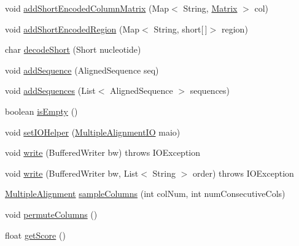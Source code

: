 \begin{DoxyCompactItemize}
\item 
void \hyperlink{classbroad_1_1core_1_1multiplealignment_1_1_multiple_alignment_ad8fe854ec8525256c7b848d48c832f64}{add\+Short\+Encoded\+Column\+Matrix} (Map$<$ String, \hyperlink{class_jama_1_1_matrix}{Matrix} $>$ col)
\item 
void \hyperlink{classbroad_1_1core_1_1multiplealignment_1_1_multiple_alignment_a034bfc282f2aaff7aa3133867dcc2963}{add\+Short\+Encoded\+Region} (Map$<$ String, short\mbox{[}$\,$\mbox{]}$>$ region)
\item 
char \hyperlink{classbroad_1_1core_1_1multiplealignment_1_1_multiple_alignment_a882c67188ee369d1897fe0a9c2cd6822}{decode\+Short} (Short nucleotide)
\item 
void \hyperlink{classbroad_1_1core_1_1multiplealignment_1_1_multiple_alignment_aca0cb83e35314cfff63b9e24508dea0d}{add\+Sequence} (Aligned\+Sequence seq)
\item 
void \hyperlink{classbroad_1_1core_1_1multiplealignment_1_1_multiple_alignment_a37e378ac0476e9ae7f70d891d7e8e644}{add\+Sequences} (List$<$ Aligned\+Sequence $>$ sequences)
\item 
boolean \hyperlink{classbroad_1_1core_1_1multiplealignment_1_1_multiple_alignment_a4c4058ed47c1cf0ccf504de279f16f41}{is\+Empty} ()
\item 
void \hyperlink{classbroad_1_1core_1_1multiplealignment_1_1_multiple_alignment_add81a0e357b98982640e70d83b3652fe}{set\+I\+O\+Helper} (\hyperlink{interfacebroad_1_1core_1_1multiplealignment_1_1_multiple_alignment_i_o}{Multiple\+Alignment\+I\+O} maio)
\item 
void \hyperlink{classbroad_1_1core_1_1multiplealignment_1_1_multiple_alignment_a579f9b05c4c4159c8233cd468aa7561a}{write} (Buffered\+Writer bw)  throws I\+O\+Exception 
\item 
void \hyperlink{classbroad_1_1core_1_1multiplealignment_1_1_multiple_alignment_a4ae8fccdd24105666c11c92b6accd2c0}{write} (Buffered\+Writer bw, List$<$ String $>$ order)  throws I\+O\+Exception 
\item 
\hyperlink{classbroad_1_1core_1_1multiplealignment_1_1_multiple_alignment}{Multiple\+Alignment} \hyperlink{classbroad_1_1core_1_1multiplealignment_1_1_multiple_alignment_a8b7d8e493f5c3ea5409d7c12f41c9237}{sample\+Columns} (int col\+Num, int num\+Consecutive\+Cols)
\item 
void \hyperlink{classbroad_1_1core_1_1multiplealignment_1_1_multiple_alignment_a5499cd13fb5a0c8c7029366328197b0e}{permute\+Columns} ()
\item 
float \hyperlink{classbroad_1_1core_1_1multiplealignment_1_1_multiple_alignment_a8b53ad42c6e6fb83173552a18b4f54f0}{get\+Score} ()

\end{DoxyCompactItemize}
